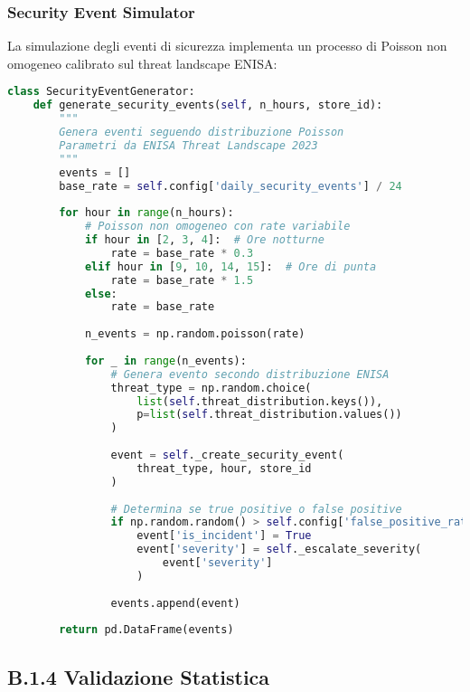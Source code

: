 \subsubsection{\texorpdfstring{\textbf{Security Event Simulator}}{Security Event Simulator}}

La simulazione degli eventi di sicurezza implementa un processo di Poisson non omogeneo calibrato sul threat landscape ENISA:

\begin{lstlisting}[language=Python, caption={Simulazione eventi sicurezza con distribuzione ENISA}, label={lst:security-gen}]
class SecurityEventGenerator:
    def generate_security_events(self, n_hours, store_id):
        """
        Genera eventi seguendo distribuzione Poisson
        Parametri da ENISA Threat Landscape 2023
        """
        events = []
        base_rate = self.config['daily_security_events'] / 24
        
        for hour in range(n_hours):
            # Poisson non omogeneo con rate variabile
            if hour in [2, 3, 4]:  # Ore notturne
                rate = base_rate * 0.3
            elif hour in [9, 10, 14, 15]:  # Ore di punta
                rate = base_rate * 1.5
            else:
                rate = base_rate
            
            n_events = np.random.poisson(rate)
            
            for _ in range(n_events):
                # Genera evento secondo distribuzione ENISA
                threat_type = np.random.choice(
                    list(self.threat_distribution.keys()),
                    p=list(self.threat_distribution.values())
                )
                
                event = self._create_security_event(
                    threat_type, hour, store_id
                )
                
                # Determina se true positive o false positive
                if np.random.random() > self.config['false_positive_rate']:
                    event['is_incident'] = True
                    event['severity'] = self._escalate_severity(
                        event['severity']
                    )
                    
                events.append(event)
                
        return pd.DataFrame(events)
\end{lstlisting}

\subsection{\texorpdfstring{\textbf{B.1.4 Validazione Statistica}}{B.1.4 - Validazione Statistica}}


